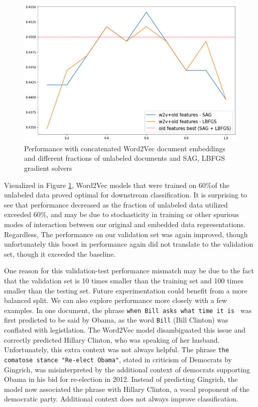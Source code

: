 \documentclass[11pt,a4paper]{article}
\begin{document}
\begin{figure}[htpb]
  \centering
  \includegraphics[width=1\linewidth]{imgs/w2v_classification.png}
  \caption{Performance with concatenated Word2Vec document embeddings and different fractions of unlabeled documents and SAG, LBFGS gradient solvers}
  \label{fig:imgs/w2v_classification}
\end{figure}

Visualized in Figure \ref{fig:imgs/w2v_classification}, Word2Vec models that were trained on 60\%of the unlabeled data proved optimal for downstream classification. It is surprising to see that 
performance decreased as the fraction of unlabeled data utilized exceeded 60\%, and may be due to stochasticity in training or other spurious modes of interaction between our original and embedded data representations. Regardless, The performance on our validation set was again improved, though unfortunately this boost in performance again did not translate to the validation set, though it exceeded the baseline.

One reason for this validation-test performance mismatch may be due to the fact that the validation set is 10 times smaller than the training set and 100 times smaller than the testing set. Future experimentation could benefit from a more balanced split. We can also explore performance more closely with a few examples. In one document, the phrase \texttt{when Bill asks what time it is } was first predicted to be said by Obama, as the word \texttt{Bill} (Bill Clinton) was conflated with legistlation. The Word2Vec model disambiguated this issue and correctly predicted Hillary Clinton, who was speaking of her husband. Unfortunately, this extra context was not always helpful. The phrase \texttt{the comatose stance "Re-elect Obama"}, stated in criticism of Democrats by Gingrich, was misinterpreted by the additional context of democrats supporting Obama in his bid for re-election in 2012. Instead of predicting Gingrich, the model now associated the phrase with Hillary Clinton, a vocal proponent of the democratic party. Additional context does not always improve classification.
\end{document}
